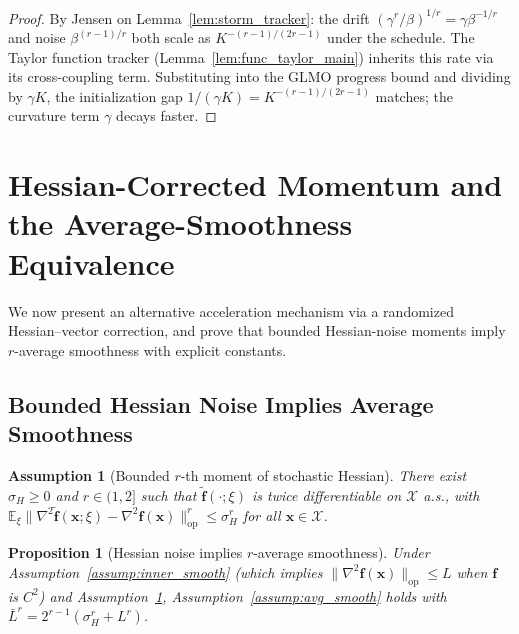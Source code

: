 \documentclass{article}
\newcommand{\cX}{\mathcal{X}}
\def\vf{{\bm{f}}}
\def\vx{{\bm{x}}}
\newcommand{\E}{\mathbb{E}}
\newtheorem{assumption}{Assumption}
\newtheorem{proposition}{Proposition}
\begin{document}
\begin{proof}
By Jensen on Lemma~\ref{lem:storm_tracker}: the drift $(\gamma^r/\beta)^{1/r} = \gamma\beta^{-1/r}$ and noise $\beta^{(r-1)/r}$ both scale as $K^{-(r-1)/(2r-1)}$ under the schedule. The Taylor function tracker (Lemma~\ref{lem:func_taylor_main}) inherits this rate via its cross-coupling term. Substituting into the GLMO progress bound and dividing by $\gamma K$, the initialization gap $1/(\gamma K) = K^{-(r-1)/(2r-1)}$ matches; the curvature term $\gamma$ decays faster.
\end{proof}

\section{Hessian-Corrected Momentum and the Average-Smoothness Equivalence} \label{sec:hessian_extension}

We now present an alternative acceleration mechanism via a randomized Hessian--vector correction, and prove that bounded Hessian-noise moments imply $r$-average smoothness with explicit constants.

\subsection{Bounded Hessian Noise Implies Average Smoothness}

\begin{assumption}[Bounded $r$-th moment of stochastic Hessian] \label{assump:hessian_var}
There exist $\sigma_H \ge 0$ and $r \in (1,2]$ such that $\tilde\vf(\cdot; \xi)$ is twice differentiable on $\cX$ a.s., with $\E_\xi\|\nabla^2\tilde\vf(\vx; \xi) - \nabla^2\vf(\vx)\|_{\mathrm{op}}^r \le \sigma_H^r$ for all $\vx \in \cX$.
\end{assumption}

\begin{proposition}[Hessian noise implies $r$-average smoothness] \label{prop:hessian_implies_avg}
Under Assumption~\ref{assump:inner_smooth} (which implies $\|\nabla^2\vf(\vx)\|_{\mathrm{op}} \le L$ when $\vf$ is $C^2$) and Assumption~\ref{assump:hessian_var}, Assumption~\ref{assump:avg_smooth} holds with $\bar L^r = 2^{r-1}(\sigma_H^r + L^r)$.
\end{proposition}
\end{document}
